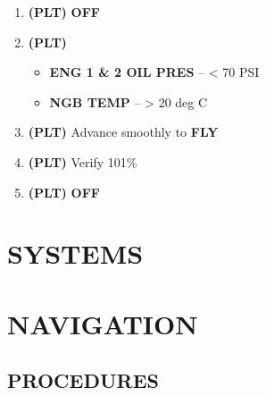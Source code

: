 \documentclass[fontHelvetica]{TechCheck}
\begin{document}
\begin{enumerate}[leftmargin=0.1\linewidth,rightmargin=0.1\linewidth, itemsep=4pt]
\begin{enumerate}[itemsep=4pt]
		\end{enumerate}
		\item {} \textbf{(PLT)} \dotfill \textbf{OFF} 
		\item {} \textbf{(PLT)}
		\begin{itemize}[itemsep=4pt]
			\item \textbf{ENG 1 \& 2 OIL PRES} -- < 70 PSI
			\item \textbf{NGB TEMP} -- > 20 deg C
		\end{itemize}
		\item {} \textbf{(PLT)} \dotfill Advance smoothly to \textbf{FLY} 
		\item {} \textbf{(PLT)} \dotfill Verify 101\% 
		\item {} \textbf{(PLT)} \dotfill \textbf{OFF}
	\end{enumerate}

	\cleardoublepage 

	\chapter{SYSTEMS}
	\minitoc
	\cleardoublepage

	\chapter{NAVIGATION}
	\minitoc
	\cleardoublepage

	\section{PROCEDURES}
\end{document}
